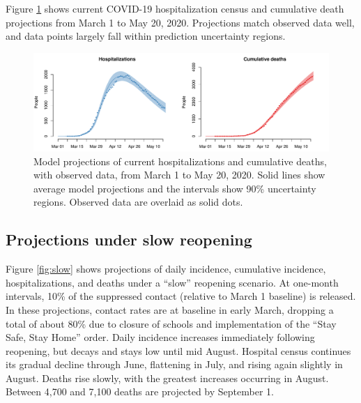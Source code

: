 \documentclass[11pt]{article}
\newcommand{\comment}[1]{[\textcolor{red}{#1}]}
\begin{document}

Figure \ref{fig:calibration} shows current COVID-19 hospitalization census and cumulative death projections from March 1 to May 20, 2020.  Projections match observed data well, and data points largely fall within prediction uncertainty regions. 


\begin{figure}
\centering
\includegraphics[width=\textwidth]{figures/calibration.pdf}
\caption{Model projections of current hospitalizations and cumulative deaths, with observed data, from March 1 to May 20, 2020. Solid lines show average model projections and the intervals show 90\% uncertainty regions.  Observed data are overlaid as solid dots.} 
\label{fig:calibration}
\end{figure}


\subsection*{Projections under slow reopening} 

Figure \ref{fig:slow} shows projections of daily incidence, cumulative incidence, hospitalizations, and deaths under a ``slow'' reopening scenario. At one-month intervals, 10\% of the suppressed contact (relative to March 1 baseline) is released.  In these projections, contact rates are at baseline in early March, dropping a total of about 80\% due to closure of schools and implementation of the ``Stay Safe, Stay Home'' order.  Daily incidence increases immediately following reopening, but decays and stays low until mid August.  Hospital census continues its gradual decline through June, flattening in July, and rising again slightly in August. Deaths rise slowly, with the greatest increases occurring in August. Between 4,700 and 7,100 deaths are projected by September 1.  
\end{document}
